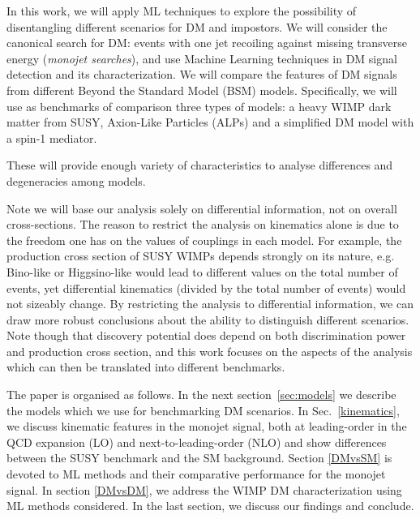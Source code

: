 \documentclass[prd,aps,letterpaper,floatfix,superscriptaddress,preprintnumbers,twocolumn,10pt,nofootinbib]{revtex4-1}
\begin{document}
In this work, we will apply ML techniques to explore the possibility of disentangling different scenarios for DM and impostors. We will consider the canonical search for DM: events with one jet recoiling against missing transverse energy ({\it monojet searches}), and use Machine Learning techniques in DM signal detection and its characterization. 
We will compare the features of DM signals from different Beyond the Standard Model (BSM) models. Specifically, we will use as benchmarks of comparison three types of models: a heavy WIMP dark matter from SUSY, Axion-Like Particles (ALPs) \cite{Mimasu:2014nea,Brivio:2017ije} and a simplified DM model with a spin-1 mediator.

These will provide enough variety of characteristics to analyse differences and degeneracies among models. 

Note we will base our analysis solely on differential information, not on overall cross-sections. The reason to restrict the analysis on kinematics alone is due to the freedom one has on the values of couplings in each model. For example, the production cross section of SUSY WIMPs depends strongly on its nature, e.g. Bino-like or Higgsino-like would lead to different values on the total number of events, yet differential kinematics (divided by the total number of events) would not sizeably change. By restricting the analysis to differential information, we can draw more robust conclusions about the ability to distinguish different scenarios. Note though that discovery potential does depend on both discrimination power and production cross section, and this work focuses on the aspects of the analysis which can then be translated into different benchmarks.    

The paper is organised as follows. In the next section~\ref{sec:models} we describe the models which we use for benchmarking DM scenarios. In Sec.~\ref{kinematics}, we discuss kinematic features in the monojet signal, both at leading-order in the QCD expansion (LO) and next-to-leading-order (NLO) and show differences between the SUSY benchmark and the SM background. Section \ref{DMvsSM} is devoted to ML methods and their comparative performance for the monojet signal. In section \ref{DMvsDM}, we address the WIMP DM characterization using ML methods considered. In the last section, we discuss our findings and conclude.
\end{document}
